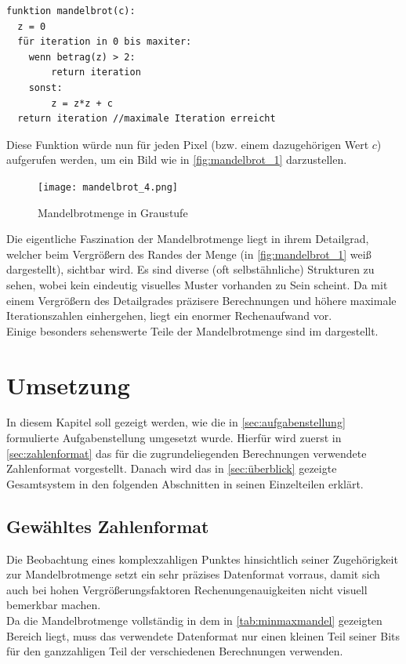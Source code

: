 \documentclass[a4paper,12pt,onesided]{report}
\begin{document}
\begin{lstlisting}[label=lst:mandelbrotpseudo,caption=Algorithmus zur Berechnung der Iterationszahl eines $c$]
funktion mandelbrot(c):
  z = 0
  für iteration in 0 bis maxiter:
 	wenn betrag(z) > 2:
 		return iteration
 	sonst:	
		z = z*z + c
  return iteration //maximale Iteration erreicht
\end{lstlisting}

Diese Funktion würde nun für jeden Pixel (bzw. einem dazugehörigen Wert $c$) aufgerufen werden, um ein Bild wie in \autoref{fig:mandelbrot_1} darzustellen.

\begin{figure}[H]
	\centering
	\texttt{[image: mandelbrot\_4.png]}
	\caption{Mandelbrotmenge in Graustufe}
	\label{fig:mandelbrot_1}
\end{figure}

Die eigentliche Faszination der Mandelbrotmenge liegt in ihrem Detailgrad, welcher beim Vergrößern des Randes der Menge (in \autoref{fig:mandelbrot_1} weiß dargestellt), sichtbar wird. Es sind diverse (oft selbstähnliche) Strukturen zu sehen, wobei kein eindeutig visuelles Muster vorhanden zu Sein scheint. Da mit einem Vergrößern des Detailgrades präzisere Berechnungen und höhere maximale Iterationszahlen einhergehen, liegt ein enormer Rechenaufwand vor.\\
Einige besonders sehenswerte Teile der Mandelbrotmenge sind im %
dargestellt.

\chapter{Umsetzung}
In diesem Kapitel soll gezeigt werden, wie die in \autoref{sec:aufgabenstellung} formulierte Aufgabenstellung umgesetzt wurde. Hierfür wird zuerst in \autoref{sec:zahlenformat} das für die zugrundeliegenden Berechnungen verwendete Zahlenformat vorgestellt. Danach wird das in \autoref{sec:überblick} gezeigte Gesamtsystem in den folgenden Abschnitten in seinen Einzelteilen erklärt.

\section{Gewähltes Zahlenformat}
\label{sec:zahlenformat}
Die Beobachtung eines komplexzahligen Punktes hinsichtlich seiner Zugehörigkeit zur Mandelbrotmenge setzt ein sehr präzises Datenformat vorraus, damit sich auch bei hohen Vergrößerungsfaktoren Rechenungenauigkeiten nicht visuell bemerkbar machen.\\
Da die Mandelbrotmenge vollständig in dem in \autoref{tab:minmaxmandel} gezeigten Bereich liegt, muss das verwendete Datenformat nur einen kleinen Teil seiner Bits für den ganzzahligen Teil der verschiedenen Berechnungen verwenden. \\
\end{document}
